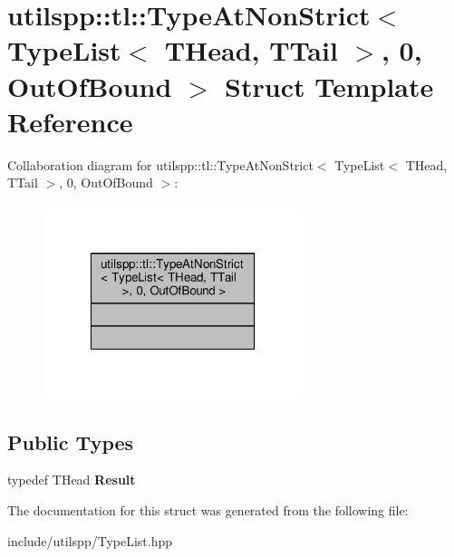 \hypertarget{structutilspp_1_1tl_1_1TypeAtNonStrict_3_01TypeList_3_01THead_00_01TTail_01_4_00_010_00_01OutOfBound_01_4}{\section{utilspp\-:\-:tl\-:\-:Type\-At\-Non\-Strict$<$ Type\-List$<$ T\-Head, T\-Tail $>$, 0, Out\-Of\-Bound $>$ Struct Template Reference}
\label{structutilspp_1_1tl_1_1TypeAtNonStrict_3_01TypeList_3_01THead_00_01TTail_01_4_00_010_00_01OutOfBound_01_4}
}


Collaboration diagram for utilspp\-:\-:tl\-:\-:Type\-At\-Non\-Strict$<$ Type\-List$<$ T\-Head, T\-Tail $>$, 0, Out\-Of\-Bound $>$\-:\nopagebreak
\begin{figure}[H]
\begin{center}
\leavevmode
\includegraphics[width=214pt]{structutilspp_1_1tl_1_1TypeAtNonStrict_3_01TypeList_3_01THead_00_01TTail_01_4_00_010_00_01OutOfBound_01_4__coll__graph}
\end{center}
\end{figure}
\subsection*{Public Types}
\begin{DoxyCompactItemize}
\item 
\hypertarget{structutilspp_1_1tl_1_1TypeAtNonStrict_3_01TypeList_3_01THead_00_01TTail_01_4_00_010_00_01OutOfBound_01_4_a03bcdd25fb77e439c64ecdcfaa318d4b}{typedef T\-Head {\bfseries Result}}\label{structutilspp_1_1tl_1_1TypeAtNonStrict_3_01TypeList_3_01THead_00_01TTail_01_4_00_010_00_01OutOfBound_01_4_a03bcdd25fb77e439c64ecdcfaa318d4b}

\end{DoxyCompactItemize}


The documentation for this struct was generated from the following file\-:\begin{DoxyCompactItemize}
\item 
include/utilspp/Type\-List.\-hpp\end{DoxyCompactItemize}
